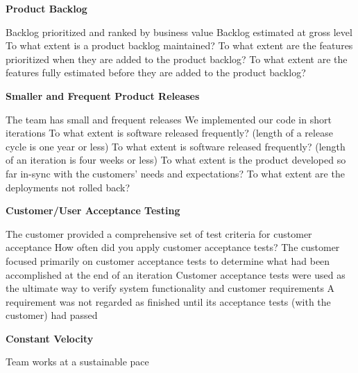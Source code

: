 \textbf{Product Backlog}
\begin{itemize}
	\taa Backlog prioritized and ranked by business value
	\taa Backlog estimated at gross level %
	\ops To what extent is a product backlog maintained?
	\ops To what extent are the features prioritized when they are added to the product backlog?
	\ops To what extent are the features fully estimated before they are added to the product backlog?
\end{itemize}

\textbf{Smaller and Frequent Product Releases}
\begin{itemize}
	\taa The team has small and frequent releases
	\pam We implemented our code in short iterations
	\ops To what extent is software released frequently? (length of a release cycle is one year or less)
	\ops To what extent is software released frequently? (length of an iteration is four weeks or less)
	\ops To what extent is the product developed so far in-sync with the customers' needs and expectations? 
	\ops To what extent are the deployments not rolled back? 
\end{itemize}

\textbf{Customer/User Acceptance Testing}
\begin{itemize}
	\pam The customer provided a comprehensive set of test criteria for customer acceptance %
	\pam How often did you apply customer acceptance tests? %
	\pam The customer focused primarily on customer acceptance tests to determine what had been accomplished at the end of an iteration %
	\pam Customer acceptance tests were used as the ultimate way to verify system functionality and customer requirements %
	\pam A requirement was not regarded as finished until its acceptance tests (with the customer) had passed %
\end{itemize}

\textbf{Constant Velocity}
\begin{itemize}
	\taa Team works at a sustainable pace %
\end{itemize}

